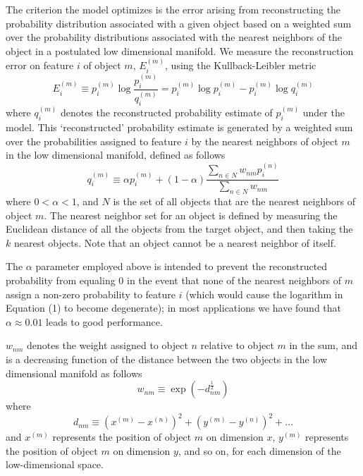 \documentclass[11pt]{article} %
\begin{document}
The criterion the model optimizes is the error arising from reconstructing the probability distribution associated with a given object based on a weighted sum over the probability distributions associated with the nearest neighbors of the object in a postulated low dimensional manifold. We measure the reconstruction error on feature $i$ of object $m$, $E^{(m)}_i$, using the Kullback-Leibler metric
\begin{equation*}
E^{(m)}_i \equiv p^{(m)}_i \log{\frac{p^{(m)}_i}{q^{(m)}_i}} = p^{(m)}_i \log p^{(m)}_i - p^{(m)}_i \log q^{(m)}_i
\tag{1}
\end{equation*}
where $q^{(m)}_i$ denotes the reconstructed probability estimate of $p^{(m)}_i$ under the model. This `reconstructed' probability estimate is generated by a weighted sum over the probabilities assigned to feature $i$ by the nearest neighbors of object $m$ in the low dimensional manifold, defined as follows
\begin{equation*}
q^{(m)}_i \equiv \alpha p^{(m)}_i + (1 - \alpha)\frac{\sum_{n \in N}w_{nm}p^{(n)}_i}{\sum_{n \in N}w_{nm}}
\tag{2}
\end{equation*}
where $0 < \alpha < 1$, and $N$ is the set of all objects that are the nearest neighbors of object $m$. The nearest neighbor set for an object is defined by measuring the Euclidean distance of all the objects from the target object, and then taking the $k$ nearest objects. Note that an object cannot be a nearest neighbor of itself.

The $\alpha$ parameter employed above is intended to prevent the reconstructed probability from equaling 0 in the event that none of the nearest neighbors of $m$ assign a non-zero probability to feature $i$ (which would cause the logarithm in Equation (1) to become degenerate); in most applications we have found that $\alpha \approx 0.01$ leads to good performance.

$w_{nm}$ denotes the weight assigned to object $n$ relative to object $m$ in the sum, and is a decreasing function of the distance between the two objects in the low dimensional manifold as follows
\begin{equation*}
w_{nm} \equiv \exp(-d_{nm}^{\frac{1}{2}})
\tag{3}
\end{equation*}
where 
\begin{equation*}
d_{nm} \equiv (x^{(m)} - x^{(n)})^2 + (y^{(m)} - y^{(n)})^2 + ...
\tag{4}
\end{equation*}
and $x^{(m)}$ represents the position of object $m$ on dimension $x$, $y^{(m)}$ represents the position of object $m$ on dimension $y$, and so on, for each dimension of the low-dimensional space.
\end{document}
